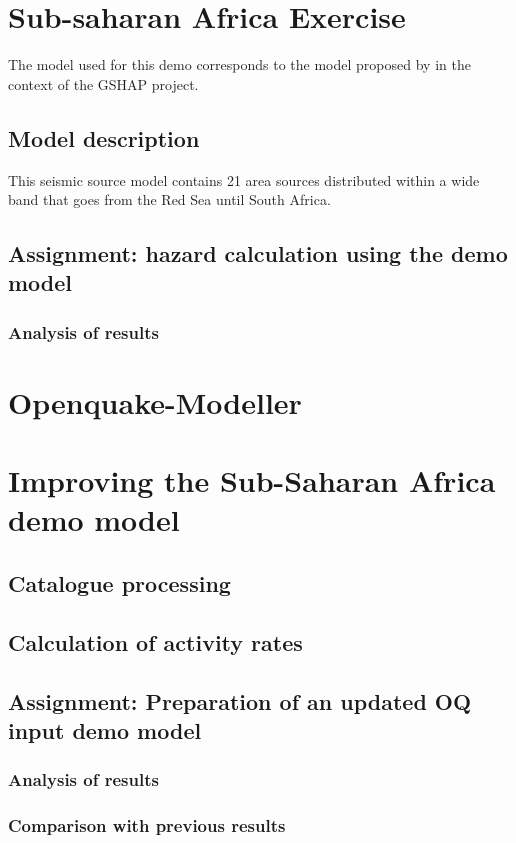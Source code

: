\documentclass[11pt,a4paper,headings=small,dvips]{scrbook}
\begin{document}
\chapter{Sub-saharan Africa Exercise}
The model used for this demo corresponds to the model proposed by 
\citet{midzi1999} in the context of the GSHAP project.
\section{Model description}
This seismic source model contains 21 area sources distributed within a wide 
band that goes from the Red Sea until South Africa.
\section{Assignment: hazard calculation using the demo model}
\subsection{Analysis of results}
\cleardoublepage
\chapter{Openquake-Modeller}
  
\cleardoublepage
\chapter{Improving the Sub-Saharan Africa demo model}
\section{Catalogue processing}
\section{Calculation of activity rates}
\section{Assignment: Preparation of an updated OQ input demo model}
\subsection{Analysis of results}
\subsection{Comparison with previous results}
\cleardoublepage


\cleardoublepage
\end{document}
